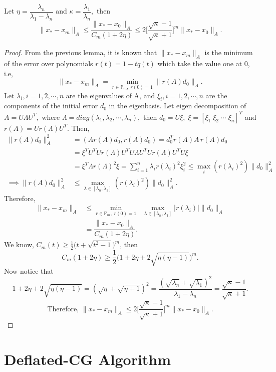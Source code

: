 \documentclass[10pt,a4paper]{article}
\begin{document}
\begin{theorem}
Let $\eta=\dfrac{\lambda_n}{\lambda_1-\lambda_n}$ and $\kappa = \dfrac{\lambda_1}{\lambda_n},$ then
$$\|x_*-x_m\|_A\le \dfrac{\|x_*-x_0\|_A}{C_m(1+2\eta)}\le 2\bigg[\dfrac{\sqrt{\kappa}-1}{\sqrt{\kappa}+1}\bigg]^m\|x_*-x_0\|_A.$$
\end{theorem}

\begin{proof}
From the previous lemma, it is known that $\|x_*-x_m\|_A$ is the minimum of the error over polynomials $r(t)=1-tq(t)$ which take the value one at 0, i.e,
$$\|x_*-x_m\|_A=\underset{r\in \mathbb{P}_m,\;r(0)=1}{\min}\|r(A)d_0\|_A.$$
Let $\lambda_i,i=1,2,\cdots,n$ are the eigenvalues of A, and $\xi_i,i=1,2,\cdots,n$ are the components of the initial error $d_0$ in the eigenbasis. Let eigen decomposition of $A=U\Lambda U^T,$ where $\Lambda=diag(\lambda_1,\lambda_2,\cdots,\lambda_n),$ then $d_0=U\xi,\;\xi=[\xi_1\;\xi_2\;\cdots\;\xi_n]^T$ and $r(A)=Ur(\Lambda)U^T$. Then,
\begin{align*}
\|r(A)d_0\|^2_A &= (Ar(A)d_0,r(A)d_0) = d^T_0r(A)A\,r(A)d_0 \\
&= \xi^TU^TUr(\Lambda)U^TU{\Lambda}U^TUr(\Lambda)U^T U\xi \\
&= \xi^T \Lambda r(\Lambda)^2\xi = \sum^n_{i=1}\lambda_ir(\lambda_i)^2\xi^2_i \le \underset{i}{\max}(r(\lambda_i)^2)\|d_0\|^2_A \\
\implies \|r(A)d_0\|^2_A &\le \underset{\lambda\in[\lambda_n,\lambda_1]}{\max}(r(\lambda_i)^2)\|d_0\|^2_A.
\end{align*}
Therefore,
\begin{align*}
\|x_*-x_m\|_A&\le\underset{r\in \mathbb{P}_m,\;r(0)=1}{\min}\;\;\underset{\lambda\in[\lambda_n,\lambda_1]}{\max}|r(\lambda_i)|\|d_0\|_A \\
&= \dfrac{\|x_*-x_0\|_A}{C_m(1+2\eta)}.
\end{align*}
We know, $C_m(t)\ge \frac{1}{2}\Big(t+\sqrt{t^2-1}\Big)^m$, then 
$$C_m(1+2\eta)\ge \frac{1}{2}\Big(1+2\eta+2\sqrt{\eta(\eta-1)}\Big)^m.$$
Now notice that
$$1+2\eta+2\sqrt{\eta(\eta-1)} = (\sqrt{\eta}+\sqrt{\eta+1})^2  = \dfrac{(\sqrt{\lambda_n}+\sqrt{\lambda_1})^2}{\lambda_1-\lambda_n} = \dfrac{\sqrt{\kappa}-1}{\sqrt{\kappa}+1}.$$
$$\text{Therefore, }\|x_*-x_m\|_A\le 2\bigg[\dfrac{\sqrt{\kappa}-1}{\sqrt{\kappa}+1}\bigg]^m\|x_*-x_0\|_A.$$
\end{proof}

\section{Deflated-CG Algorithm}
\end{document}
